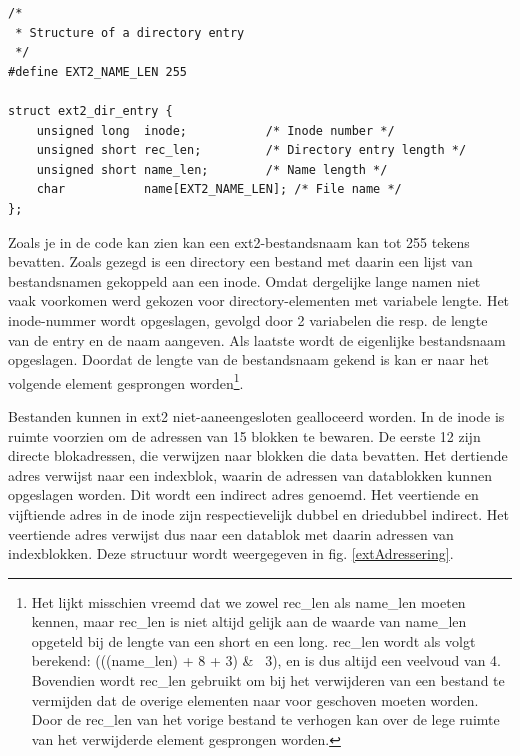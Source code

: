 \begin{verbatim}
/*
 * Structure of a directory entry
 */
#define EXT2_NAME_LEN 255

struct ext2_dir_entry {
    unsigned long  inode;           /* Inode number */
    unsigned short rec_len;         /* Directory entry length */
    unsigned short name_len;        /* Name length */
    char           name[EXT2_NAME_LEN]; /* File name */
};
\end{verbatim}

Zoals je in de code kan zien kan een ext2-bestandsnaam kan tot 255 tekens bevatten. Zoals gezegd is
een directory een bestand met daarin een lijst van bestandsnamen gekoppeld aan een inode. Omdat dergelijke
lange namen niet vaak voorkomen werd gekozen voor directory-elementen met variabele lengte. Het inode-nummer
wordt opgeslagen, gevolgd door 2 variabelen die resp. de lengte van de entry en de naam aangeven. Als laatste
wordt de eigenlijke bestandsnaam opgeslagen. Doordat de lengte van de bestandsnaam gekend is kan er
naar het volgende element gesprongen worden\footnote{Het lijkt misschien vreemd dat we zowel
rec\_len als name\_len moeten kennen, maar rec\_len is niet altijd gelijk aan de waarde van name\_len
opgeteld bij de lengte van een short en een long. rec\_len wordt als volgt berekend:
(((name\_len) + 8 + 3) \& ~3), en is dus altijd een veelvoud van 4. Bovendien wordt rec\_len
gebruikt om bij het verwijderen van een bestand te vermijden dat de overige elementen naar voor
geschoven moeten worden. Door de rec\_len van het vorige bestand te verhogen kan over de lege
ruimte van het verwijderde element gesprongen worden.}.

Bestanden kunnen in ext2 niet-aaneengesloten gealloceerd worden. In de inode is ruimte voorzien om de
adressen van 15 blokken te bewaren. De eerste 12 zijn directe blokadressen, die verwijzen naar blokken
die data bevatten. Het dertiende adres verwijst naar een indexblok, waarin de adressen van datablokken kunnen
opgeslagen worden. Dit wordt een indirect adres genoemd. Het veertiende en vijftiende adres in de inode
zijn respectievelijk dubbel en driedubbel indirect. Het veertiende adres verwijst dus naar een datablok met
daarin adressen van indexblokken. Deze structuur wordt weergegeven in fig. \ref{extAdressering}.

